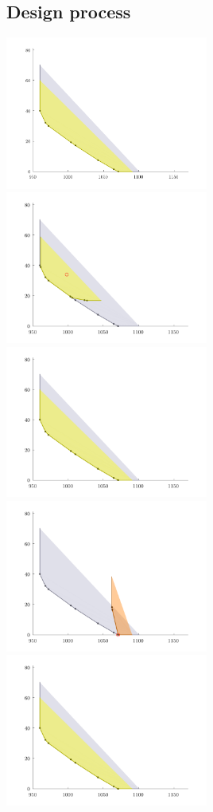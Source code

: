 \newpage

\subsection*{Design process}

\includegraphics[width=0.5\textwidth]{plot1.pdf} 
\includegraphics[width=0.5\textwidth]{plot2.pdf} 
\includegraphics[width=0.5\textwidth]{plot3.pdf} 
\includegraphics[width=0.5\textwidth]{plot4.pdf} 
\includegraphics[width=0.5\textwidth]{plot5.pdf} 
